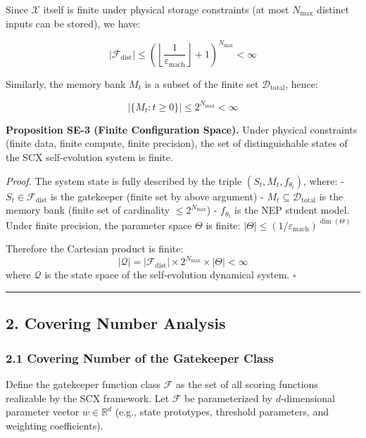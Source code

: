 \documentclass[
  12pt,
]{article}
\begin{document}
Since \(\mathcal{X}\) itself is finite under physical storage
constraints (at most \(N_{\text{max}}\) distinct inputs can be stored),
we have:

\[|\mathcal{F}_{\text{dist}}| \leq \left( \left\lfloor \frac{1}{\varepsilon_{\text{mach}}} \right\rfloor + 1 \right)^{N_{\text{max}}} < \infty\]

Similarly, the memory bank \(M_t\) is a subset of the finite set
\(\mathcal{D}_{\text{total}}\), hence:

\[|\{M_t : t \geq 0\}| \leq 2^{N_{\text{max}}} < \infty\]

\textbf{Proposition SE-3 (Finite Configuration Space).} Under physical
constraints (finite data, finite compute, finite precision), the set of
distinguishable states of the SCX self-evolution system is finite.

\emph{Proof.} The system state is fully described by the triple
\((S_t, M_t, f_{\theta_t})\), where: -
\(S_t \in \mathcal{F}_{\text{dist}}\) is the gatekeeper (finite set by
above argument) - \(M_t \subseteq \mathcal{D}_{\text{total}}\) is the
memory bank (finite set of cardinality \(\leq 2^{N_{\text{max}}}\)) -
\(f_{\theta_t}\) is the NEP student model. Under finite precision, the
parameter space \(\Theta\) is finite:
\(|\Theta| \leq (1/\varepsilon_{\text{mach}})^{\dim(\Theta)}\)

Therefore the Cartesian product is finite:
\[|\mathcal{Q}| = |\mathcal{F}_{\text{dist}}| \times 2^{N_{\text{max}}} \times |\Theta| < \infty\]
where \(\mathcal{Q}\) is the state space of the self-evolution dynamical
system. \(\square\)

\begin{center}\rule{0.5\linewidth}{0.5pt}\end{center}

\subsection{2. Covering Number Analysis}\label{covering-number-analysis}

\subsubsection{2.1 Covering Number of the Gatekeeper
Class}\label{covering-number-of-the-gatekeeper-class}

Define the gatekeeper function class \(\mathcal{F}\) as the set of all
scoring functions realizable by the SCX framework. Let \(\mathcal{F}\)
be parameterized by \(d\)-dimensional parameter vector
\(w \in \mathbb{R}^d\) (e.g., state prototypes, threshold parameters,
and weighting coefficients).
\end{document}
